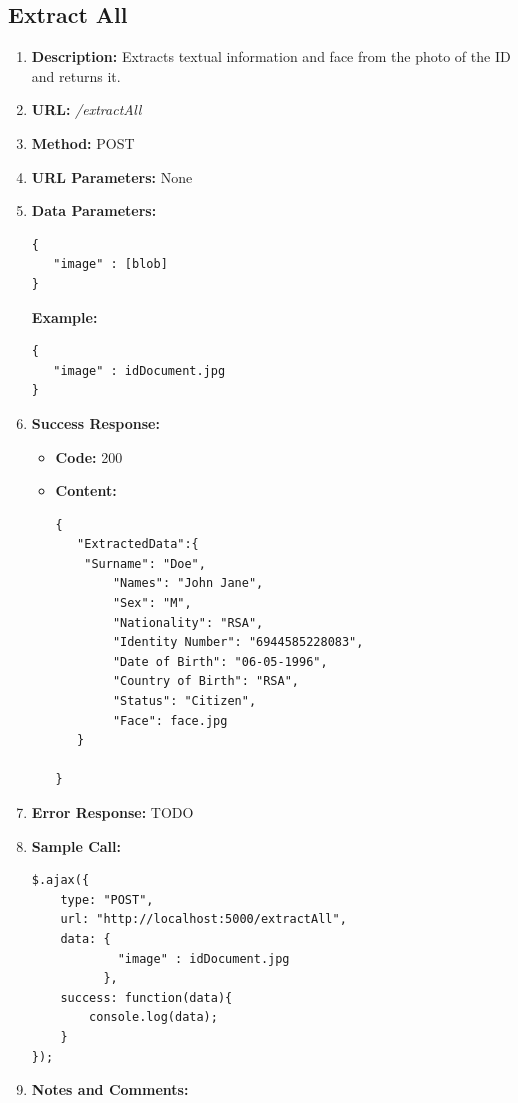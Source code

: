 \documentclass{article}
\begin{document}
\subsection{Extract All}
\begin{enumerate}
	\item \textbf{Description:} Extracts textual information and face from the photo of the ID and returns it.
	\item \textbf{URL:} \textit{/extractAll}
	\item \textbf{Method:} POST
	\item \textbf{URL Parameters:} None
	\item \textbf{Data Parameters:}

	\begin{lstlisting}
{
   "image" : [blob]
}
	\end{lstlisting}

	\textbf{Example:}

	\begin{lstlisting}
{
   "image" : idDocument.jpg
}
	\end{lstlisting}
	
	\item \textbf{Success Response:} 
		\begin{itemize}
			\item \textbf{Code:} 200
			\item \textbf{Content:}
			\begin{lstlisting}
{
   "ExtractedData":{
   	"Surname": "Doe",
        "Names": "John Jane",
        "Sex": "M",
        "Nationality": "RSA",
        "Identity Number": "6944585228083",
        "Date of Birth": "06-05-1996",
        "Country of Birth": "RSA",
        "Status": "Citizen",
        "Face": face.jpg
   }

}
			\end{lstlisting}
		\end{itemize}
		\item \textbf{Error Response:} TODO
		\item \textbf{Sample Call:}
		\begin{lstlisting}
$.ajax({
    type: "POST",
    url: "http://localhost:5000/extractAll",
    data: {
            "image" : idDocument.jpg
          },
    success: function(data){
        console.log(data);
    }
});
		\end{lstlisting}
		\item \textbf{Notes and Comments:}
\end{enumerate}
\end{document}
